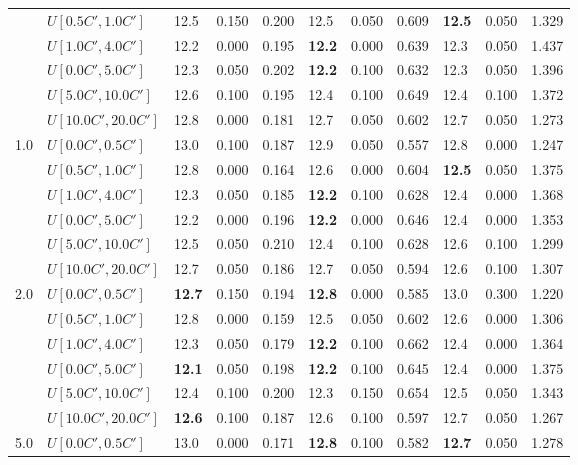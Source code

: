 \begin{table}[h]
{\begin{tabular}{|l|l||l|l|l||l|l|l||l|l|l|}
       & $U[0.5C',1.0C']$ & 12.5 & 0.150 & 0.200 & 12.5 & 0.050 & 0.609 & \textbf{12.5} & 0.050 & 1.329 \\
       & $U[1.0C',4.0C']$ & 12.2 & 0.000 & 0.195 & \textbf{12.2} & 0.000 & 0.639 & 12.3 & 0.050 & 1.437 \\
       & $U[0.0C',5.0C']$ & 12.3 & 0.050 & 0.202 & \textbf{12.2} & 0.100 & 0.632 & 12.3 & 0.050 & 1.396 \\
       & $U[5.0C',10.0C']$ & 12.6 & 0.100 & 0.195 & 12.4 & 0.100 & 0.649 & 12.4 & 0.100 & 1.372 \\
       & $U[10.0C',20.0C']$ & 12.8 & 0.000 & 0.181 & 12.7 & 0.050 & 0.602 & 12.7 & 0.050 & 1.273 \\
      \hline\hline
      \multirow{6}{*}{1.0} & $U[0.0C',0.5C']$ & 13.0 & 0.100 & 0.187 & 12.9 & 0.050 & 0.557 & 12.8 & 0.000 & 1.247 \\
       & $U[0.5C',1.0C']$ & 12.8 & 0.000 & 0.164 & 12.6 & 0.000 & 0.604 & \textbf{12.5} & 0.050 & 1.375 \\
       & $U[1.0C',4.0C']$ & 12.3 & 0.050 & 0.185 & \textbf{12.2} & 0.100 & 0.628 & 12.4 & 0.000 & 1.368 \\
       & $U[0.0C',5.0C']$ & 12.2 & 0.000 & 0.196 & \textbf{12.2} & 0.000 & 0.646 & 12.4 & 0.000 & 1.353 \\
       & $U[5.0C',10.0C']$ & 12.5 & 0.050 & 0.210 & 12.4 & 0.100 & 0.628 & 12.6 & 0.100 & 1.299 \\
       & $U[10.0C',20.0C']$ & 12.7 & 0.050 & 0.186 & 12.7 & 0.050 & 0.594 & 12.6 & 0.100 & 1.307 \\
      \hline\hline
      \multirow{6}{*}{2.0} & $U[0.0C',0.5C']$ & \textbf{12.7} & 0.150 & 0.194 & \textbf{12.8} & 0.000 & 0.585 & 13.0 & 0.300 & 1.220 \\
       & $U[0.5C',1.0C']$ & 12.8 & 0.000 & 0.159 & 12.5 & 0.050 & 0.602 & 12.6 & 0.000 & 1.306 \\
       & $U[1.0C',4.0C']$ & 12.3 & 0.050 & 0.179 & \textbf{12.2} & 0.100 & 0.662 & 12.4 & 0.000 & 1.364 \\
       & $U[0.0C',5.0C']$ & \textbf{12.1} & 0.050 & 0.198 & \textbf{12.2} & 0.100 & 0.645 & 12.4 & 0.000 & 1.375 \\
       & $U[5.0C',10.0C']$ & 12.4 & 0.100 & 0.200 & 12.3 & 0.150 & 0.654 & 12.5 & 0.050 & 1.343 \\
       & $U[10.0C',20.0C']$ & \textbf{12.6} & 0.100 & 0.187 & 12.6 & 0.100 & 0.597 & 12.7 & 0.050 & 1.267 \\
      \hline\hline
      \multirow{6}{*}{5.0} & $U[0.0C',0.5C']$ & 13.0 & 0.000 & 0.171 & \textbf{12.8} & 0.100 & 0.582 & \textbf{12.7} & 0.050 & 1.278 \\

\end{tabular}}
\end{table}

